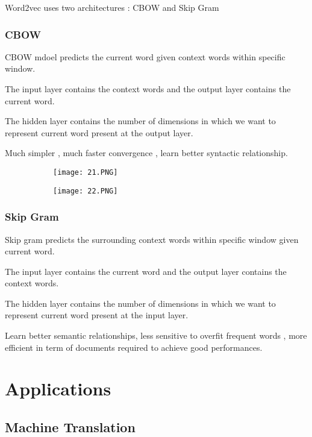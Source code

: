 \documentclass{article}
\begin{document}
Word2vec uses two architectures : CBOW and Skip Gram

\subsubsection{CBOW}

CBOW mdoel predicts the current word given context words within specific window.

The input layer contains the context words and the output layer contains the current word.

The hidden layer contains the number of dimensions in which we want to represent current word present at the output layer.

Much simpler , much faster convergence , learn better syntactic relationship.


\begin{figure}[ht!]
  \centering
  \begin{subfigure}[b]{0.2\linewidth}
    \texttt{[image: 21.PNG]}
  \end{subfigure}
     \begin{subfigure}[b]{0.2\textwidth}
         \centering
         \texttt{[image: 22.PNG]}
     \end{subfigure}
\end{figure}

\subsubsection{Skip Gram}

Skip gram predicts the surrounding context words within specific window given current word.

The input layer contains the current word and the output layer contains the context words.

The hidden layer contains the number of dimensions in which we want to represent current word present at the input layer.

Learn better semantic relationships, less sensitive to overfit frequent words , more efficient in term of documents required to achieve good performances.


\section{Applications}

\subsection{Machine Translation}
\end{document}
